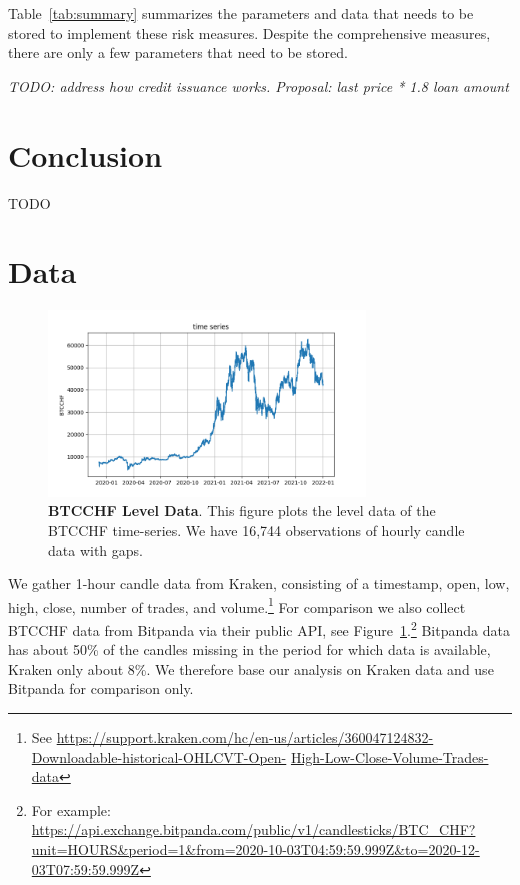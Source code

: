 \documentclass[english,11pt]{article}
\begin{document}
Table~\ref{tab:summary} summarizes the parameters and data that needs to be
stored to implement these risk measures. Despite the comprehensive
measures, there are only a few parameters that need to be stored.

\emph{TODO: address how credit issuance works. Proposal: last price * 1.8 loan amount}
\clearpage
\section{Conclusion}
TODO

\newpage



\clearpage
\appendix
\section{Data}\label{appx:data}
\begin{figure}[h]
    \center
    \includegraphics[width=0.75\textwidth]{time_series.png}
    \caption{\textbf{BTCCHF Level Data}. This figure plots
    the level data of the BTCCHF time-series. 
    We have 16,744 observations of hourly candle data with gaps.}\label{fig:timeseries}
\end{figure}

We gather 1-hour candle data from Kraken, consisting of a timestamp, open, low,
high, close, number of trades, and volume.\footnote{See \url{https://support.kraken.com/hc/en-us/articles/360047124832-Downloadable-historical-OHLCVT-Open-} \url{High-Low-Close-Volume-Trades-data}}
For comparison we also collect BTCCHF data from Bitpanda via their public 
API, see Figure~\ref{fig:timeseries}.\footnote{For example: \url{https://api.exchange.bitpanda.com/public/v1/candlesticks/BTC_CHF?unit=HOURS&period=1&from=2020-10-03T04:59:59.999Z&to=2020-12-03T07:59:59.999Z}}
Bitpanda data has about 50\% of the candles missing in the period for which 
data is available, Kraken only about 8\%. 
We therefore base our analysis on Kraken data and use Bitpanda for comparison
only.
\end{document}

